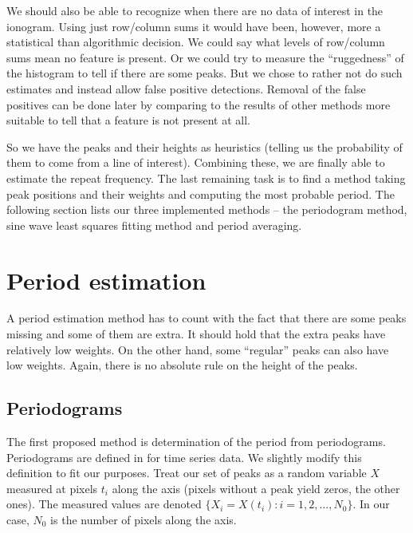 We should also be able to recognize when there are no data of interest in the ionogram. Using just row/column sums it would have been, however, more a statistical than algorithmic decision. We could say what levels of row/column sums mean no feature is present. Or we could try to measure the ``ruggedness'' of the histogram to tell if there are some peaks. But we chose to rather not do such estimates and instead allow false positive detections. Removal of the false positives can be done later by comparing to the results of other methods more suitable to tell that a feature is not present at all. 

So we have the peaks and their heights as heuristics (telling us the probability of them to come from a line of interest). Combining these, we are finally able to estimate the repeat frequency. The last remaining task is to find a method taking peak positions and their weights and computing the most probable period. The following section lists our three implemented methods -- the periodogram method, sine wave least squares fitting method and period averaging.

\section{Period estimation}
A period estimation method has to count with the fact that there are some peaks missing and some of them are extra. It should hold that the extra peaks have relatively low weights. On the other hand, some ``regular'' peaks can also have low weights. Again, there is no absolute rule on the height of the peaks.

\subsection{Periodograms}
\label{ssec:periodogram}
The first proposed method is determination of the period from periodograms. Periodograms are defined in \citep{Scargle1982} for time series data. We slightly modify this definition to fit our purposes. Treat our set of peaks as a random variable $X$ measured at pixels $t_i$ along the axis (pixels without a peak yield zeros, the other ones). The measured values are denoted $\lbrace X_i = X(t_i): i = 1, 2, \ldots, N_0 \rbrace$. In our case, $N_0$ is the number of pixels along the axis. 

